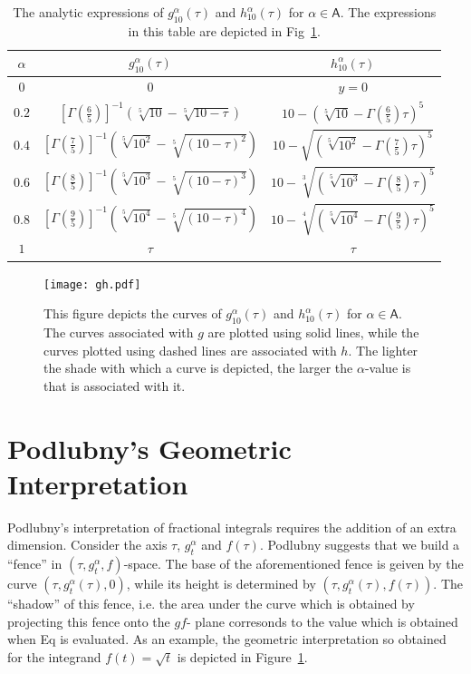 \documentclass[twoside,reqno,11pt]{fcaa-var} %
\begin{document}
\begin{table}[h!]
 \centering
 \caption{The analytic expressions of $g_{10}^{\alpha}(\tau)$ and $h_{10}^{\alpha}(\tau)$ for $\alpha\in\mathsf{A}$. The expressions in this table are depicted in Fig~\ref{fig:gandh}.}
 \label{tab:gandh}
 \begin{tabular}{|c || c | c|} 
 \hline
 $\alpha$ & $g_{10}^{\alpha}(\tau)$ & $h_{10}^{\alpha}(\tau)$ \\ [0.5ex] 
 \hline\hline
 $0$ & 0 & $y=0$ \\ 
 $0.2$ & $[\Gamma\left (\frac{6}{5} \right )]^{-1}\left(\sqrt[5]{10}-\sqrt[5]{10-\tau}\right)$ & $10 - \left ( \sqrt[5]{10} -  \Gamma\left (\frac{6}{5} \right ) \tau \right )^5$  \\
 $0.4$ & $[\Gamma\left (\frac{7}{5} \right )]^{-1}\left(\sqrt[5]{10^2}-\sqrt[5]{(10-\tau)^2}\right)$ & $10 - \sqrt{\left ( \sqrt[5]{10^2} -  \Gamma\left (\frac{7}{5} \right ) \tau \right )^5}$ \\
 $0.6$ & $[\Gamma\left (\frac{8}{5} \right )]^{-1}\left(\sqrt[5]{10^3}-\sqrt[5]{(10-\tau)^3}\right)$ & $10 - \sqrt[3]{\left ( \sqrt[5]{10^3} -  \Gamma\left (\frac{8}{5} \right ) \tau \right )^5}$ \\
 $0.8$ & $[\Gamma\left (\frac{9}{5} \right )]^{-1}\left(\sqrt[5]{10^4}-\sqrt[5]{(10-\tau)^4}\right)$ & $10 - \sqrt[4]{\left ( \sqrt[5]{10^4} -  \Gamma\left (\frac{9}{5} \right ) \tau \right )^5}$ \\ [1ex] 
 $1$ & $\tau$ & $\tau$ \\ [1ex] 
 \hline
 \end{tabular}
 \end{table}

\begin{figure}[htb]
\centering
\texttt{[image: gh.pdf]}
\caption{This figure depicts the curves of $g_{10}^{\alpha}(\tau)$ and $h_{10}^{\alpha}(\tau)$ for $\alpha\in\mathsf{A}$. The curves associated with $g$ are plotted using 
solid lines, while the curves plotted using dashed lines are associated with $h$. The lighter the shade with which a curve is depicted, the larger the $\alpha$-value is that is associated with it.
}
\label{fig:gandh}
\end{figure}

\section{Podlubny's Geometric Interpretation}
Podlubny's interpretation of fractional integrals requires the addition of an extra dimension. Consider the axis $\tau$, $g_t^{\alpha}$ and $f(\tau)$. Podlubny suggests that we build a ``fence'' in $(\tau,g_t^{\alpha},f)$-space. The base of the aforementioned fence is geiven by the curve $(\tau,g_t^{\alpha}(\tau),0)$, while its height is determined by $(\tau,g_t^{\alpha}(\tau),f(\tau))$. The 
``shadow'' of this fence, i.e. the area under the curve which is obtained by 
projecting this fence onto the $gf$- plane corresonds to the value which is obtained when Eq is evaluated. As an example, the geometric interpretation so obtained for 
the integrand $f(t)=\sqrt{t}$ is depicted in Figure~\ref{}.
\end{document}

